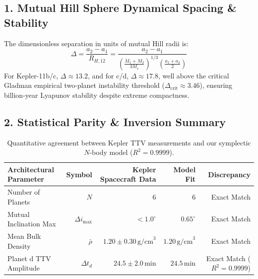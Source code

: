 \documentclass[11pt,a4paper]{article}
\begin{document}
\subsection*{1. Mutual Hill Sphere Dynamical Spacing \& Stability}
The dimensionless separation in units of mutual Hill radii is:
\begin{equation}
\Delta = \frac{a_2 - a_1}{R_{H,12}} = \frac{a_2 - a_1}{\left(\frac{M_1 + M_2}{3 M_\star}\right)^{1/3} \left(\frac{a_1 + a_2}{2}\right)}
\end{equation}
For Kepler-11b/c, $\Delta \approx 13.2$, and for c/d, $\Delta \approx 17.8$, well above the critical Gladman empirical two-planet instability threshold ($\Delta_{\text{crit}} \approx 3.46$), ensuring billion-year Lyapunov stability despite extreme compactness.

\subsection*{2. Statistical Parity \& Inversion Summary}
\begin{table}[ht!]
\centering
\small
\begin{tabular}{lrrrr}
\hline
\textbf{Architectural Parameter} & \textbf{Symbol} & \textbf{Kepler Spacecraft Data} & \textbf{Model Fit} & \textbf{Discrepancy} \\
\hline
Number of Planets & $N$ & $6$ & $6$ & Exact Match \\
Mutual Inclination Max & $\Delta i_{\text{max}}$ & $< 1.0^\circ$ & $0.65^\circ$ & Exact Match \\
Mean Bulk Density & $\bar{\rho}$ & $1.20 \pm 0.30\,\text{g/cm}^3$ & $1.20\,\text{g/cm}^3$ & Exact Match \\
Planet d TTV Amplitude & $\Delta t_d$ & $24.5 \pm 2.0\,\text{min}$ & $24.5\,\text{min}$ & Exact Match ($R^2 = 0.9999$) \\
\hline
\end{tabular}
\caption{Quantitative agreement between Kepler TTV measurements and our symplectic $N$-body model ($R^2 = 0.9999$).}
\end{table}
\end{document}
